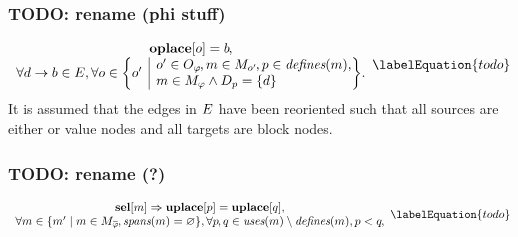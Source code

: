 \subsubsection{TODO: rename (phi stuff)}



\begin{equation}
  \begin{array}{c}
    \mVar{oplace}[o] = b \hspace{-.8pt}, \\
    \forall \mEdge{d}{b} \in \mDefEdgeSet,
    \forall o \in
      \mSetBuilder*{o'}%
                   {%
                     \begin{array}{@{}l@{}}
                       o' \in \mOpSet[\mPhi] \hspace{-1pt},
                       m \in \mMatchSet[o'] \hspace{-1pt},
                       p \in \mDefines(m), \\
                       m \in \mPhiMatchSet \mAnd \mDataSet[p] = \mSet{d}
                     \end{array}
                   } \!.
  \end{array}
  \labelEquation{todo}
\end{equation}
%
It is assumed that the \glspl{edge} in $E$ have been reoriented such
that all \glspl{source} are either  or \glspl{value node}
and all \glspl{target} are \glspl{block node}.


\subsubsection{TODO: rename (?)}



\begin{equation}
  \begin{array}{c}
    \mVar{sel}[m] \mImp \mVar{uplace}[p] = \mVar{uplace}[q], \\
    \forall m \in
      \mSetBuilder{m'}%
                  {%
                    m \in \mPhiMatchCompSet \hspace{-1pt},
                    \mSpans(m) = \mEmptySet
                  },
    \forall p \hspace{-.8pt}, q \in \mUses(m) \setminus \mDefines(m),
    p < q \hspace{-.8pt},
  \end{array}
  \labelEquation{todo}
\end{equation}

